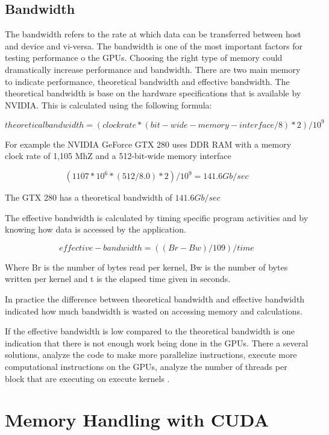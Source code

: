\subsection{Bandwidth}

The bandwidth refers to the rate at which data can be transferred between host and device and vi-versa. The bandwidth is one of the most important factors for testing performance o the GPUs.  Choosing the right type of memory could dramatically increase performance and bandwidth.  There are two main memory to indicate performance, theoretical bandwidth and effective bandwidth.
The theoretical bandwidth is base on the hardware specifications that is available by NVIDIA. This is calculated using the following formula:

$$ theoretical bandwidth = (clock rate * (bit-wide-memory-interface / 8 )*2) / 10^9 $$

For example the NVIDIA GeForce GTX 280 uses DDR RAM with a memory clock rate of 1,105 MhZ and a 512-bit-wide memory interface

$$ (1107 * 10^6 * (512/8.0) *2 )/10^9 = 141.6 Gb /sec$$

The GTX 280 has a theoretical bandwidth of $141.6Gb/sec$

The effective bandwidth is calculated by timing  specific program activities and by knowing how data is accessed by the application. \cite{practices}

$$effective-bandwidth = ((Br - Bw) / 109 )/time$$

Where Br is the number of bytes read per kernel, Bw is the number of bytes written per kernel and  t is the elapsed time given in seconds.  \cite{fortran}

In practice the difference between theoretical bandwidth and effective bandwidth indicated how much bandwidth is wasted on accessing memory and calculations.

If the effective bandwidth is low compared to the theoretical bandwidth is one indication that there is not enough work being done in the GPUs. There a several solutions, analyze the code to make  more parallelize instructions, execute more computational instructions on the GPUs, analyze the number of threads per block that are executing on execute kernels .


\section{Memory Handling with CUDA}

